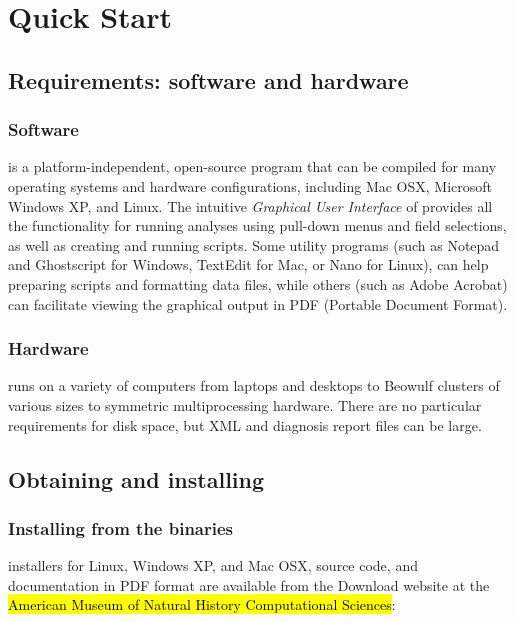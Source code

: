 \chapter{\poy Quick Start}

\section{Requirements: software and hardware}

\subsection{Software}
\poy is a platform-independent, open-source program that can be compiled for many operating systems 
and hardware configurations, including Mac OSX, Microsoft Windows XP, and Linux. %
The intuitive \emph{Graphical User Interface} of \poy provides all the functionality for running analyses using pull-down 
menus and field selections, as well as creating and running \poy scripts. Some utility programs (such as Notepad 
and Ghostscript for Windows, TextEdit for Mac, or Nano for Linux), can help preparing \poy scripts and formatting 
data files, while others (such as Adobe Acrobat) can facilitate viewing the graphical output in PDF (Portable Document Format).

\subsection{Hardware}
\poy runs on a variety of computers from laptops and desktops to Beowulf clusters 
of various sizes to symmetric multiprocessing hardware. There are no
particular requirements for disk space, but XML and diagnosis report files can be large.

\section{Obtaining and installing \poy}
\subsection{Installing from the binaries}
\poy installers for Linux, Windows XP, and Mac OSX, source code, and documentation in PDF format are available from 
the \poy Download website at the \hl{American Museum of Natural History Computational Sciences}:

